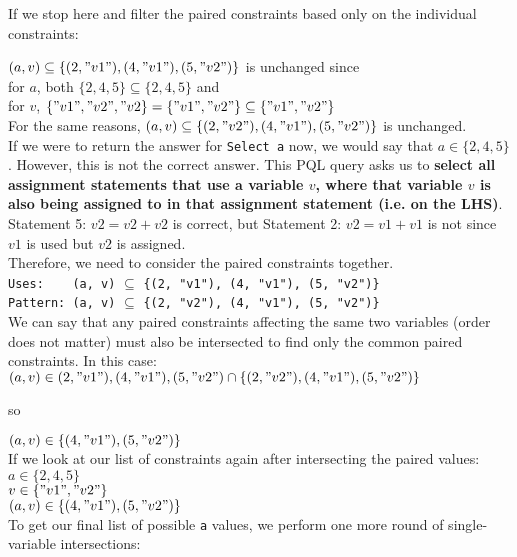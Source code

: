 \documentclass{article}
\begin{document}
If we stop here and filter the paired constraints based only on the individual constraints: 


 $(a, v) \subseteq \{(2, "v1"), (4, "v1"), (5, "v2")\}$ is unchanged since\\ for $a$, both $\{2, 4, 5\} \subseteq \{2, 4, 5\}$  and\\for 
 $v$, $\{"v1", "v2", "v2\} = \{"v1", "v2"\} \subseteq \{"v1", "v2"\}$ \\
 
For the same reasons, $(a, v) \subseteq \{(2, "v2"), (4, "v1"), (5, "v2")\}$ is unchanged. \\
 
If we were to return the answer for \texttt{Select a} now, we would say that $a \in \{2, 4, 5\}$. However, this is not the correct answer.  This PQL query asks us to \textbf{select all assignment statements that use a variable $v$, where that variable $v$ is also being assigned to in that assignment statement (i.e. on the LHS)}. Statement 5: $v2 = v2+v2$ is correct, but Statement 2: $v2 = v1 + v1$ is not since $v1$ is used but $v2$ is assigned. \\

Therefore, we need to consider the paired constraints together. \\
\verb|Uses:    (a, v)| $\subseteq$ \verb|{(2, "v1"), (4, "v1"), (5, "v2")}| \\
\verb|Pattern: (a, v)| $\subseteq$ \verb|{(2, "v2"), (4, "v1"), (5, "v2")}| \\

We can say that any paired constraints affecting the same two variables (order does not matter) must also be intersected to find only the common paired constraints. In this case: \\

$(a, v) \in {(2, "v1"), (4, "v1"), (5, "v2")}  \cap \{(2, "v2"), (4, "v1"), (5, "v2")\} $

so

$(a, v) \in \{(4, "v1"), (5, "v2")\}$ \\

If we look at our list of constraints again after intersecting the paired values: \\

$a \in \{2, 4, 5\}$ \\
$v \in \{"v1", "v2"\}$\\
$(a, v) \in \{(4, "v1"), (5, "v2")\}$ \\

To get our final list of possible \texttt{a} values, we perform one more round of single-variable intersections: \\
\end{document}
